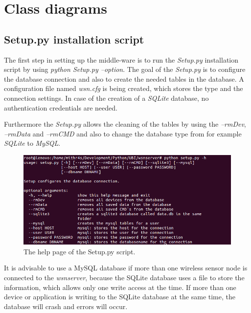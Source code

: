 \newpage
\section{Class diagrams}
\subsection{Setup.py installation script}
The first step in setting up the middle-ware is to run the \textit{Setup.py} installation script by using \textit{python Setup.py --option}. The goal of the \textit{Setup.py} is to configure the database connection and also to create the needed tables in the database. A configuration file named \textit{wsn.cfg} is being created, which stores the type and the connection settings. In case of the creation of a \textit{SQLite} database, no authentication credentials are needed.

Furthermore the \textit{Setup.py} allows the cleaning of the tables by using the \textit{--rmDev},  \textit{--rmData} and \textit{--rmCMD} and also to change the database type from for example \textit{SQLite} to \textit{MySQL}.

\begin{figure}[H]
	\centering
	\includegraphics[width=1.0\textwidth]{pic/Setuppy.png}%
    \caption{The help page of the Setup.py script.}
    \label{Setuppypic}%
\end{figure}

It is advisable to use a MySQL database if more than one wireless sensor node is connected to the \textit{wsnserver}, because the SQLite database uses a file to store the information, which allows only one write access at the time. If more than one device or application is writing to the SQLite database at the same time, the database will crash and errors will occur.

\newpage
